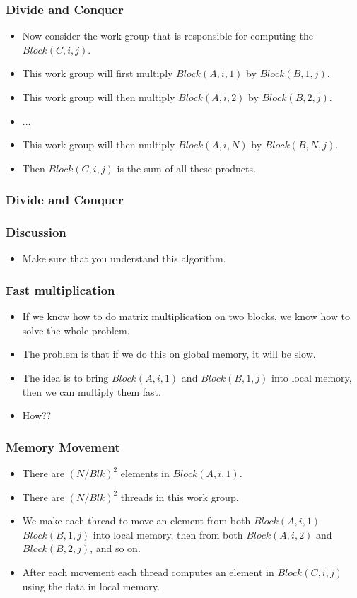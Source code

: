 \documentclass{beamer}
\begin{document}
\begin{frame}
  \frametitle{Divide and Conquer}
  \begin{itemize}
  \item Now consider the work group that is responsible for
    computing the $Block(C, i, j)$.
  \item This work group will first multiply $Block(A, i, 1)$ by
    $Block(B, 1, j)$.
  \item This work group will then multiply $Block(A, i, 2)$ by
    $Block(B, 2, j)$.
  \item ...
  \item This work group will then multiply $Block(A, i, N)$ by
    $Block(B, N, j)$.
  \item Then $Block(C, i, j)$ is the sum of all these products.
  \end{itemize}
\end{frame}

\begin{frame}
  \frametitle{Divide and Conquer}
  \centerline{}
\end{frame}

\begin{frame}
  \frametitle{Discussion}
  \begin{itemize}
  \item Make sure that you understand this algorithm.
  \end{itemize}
\end{frame}

\begin{frame}
  \frametitle{Fast multiplication}
  \begin{itemize}
    \item If we know how to do matrix multiplication on two blocks, we
      know how to solve the whole problem.
    \item The problem is that if we do this on global memory, it will
      be slow.
    \item The idea is to bring $Block(A, i, 1)$ and $Block(B, 1,
      j)$ into local memory, then we can multiply them fast.
    \item How??
  \end{itemize}
\end{frame}

\begin{frame}
  \frametitle{Memory Movement}
  \begin{itemize}
  \item There are $(N / Blk)^2$ elements in $Block(A, i, 1)$.
  \item There are $(N / Blk)^2$ threads in this work group.
  \item We make each thread to move an element from both $Block(A, i,
    1)$ $Block(B, 1, j)$ into local memory, then from both $Block(A,
    i, 2)$ and $Block(B, 2, j)$, and so on.
  \item After each movement each thread computes an element in
    $Block(C, i, j)$ using the data in local memory.
  \end{itemize}
\end{frame}
\end{document}
